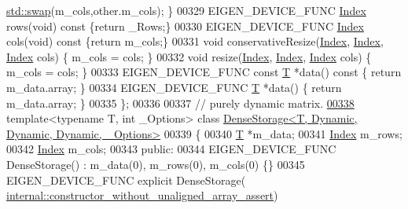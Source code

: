\begin{DoxyCode}
      \hyperlink{endian_8c_a3ca5ecd34b04d6a243c054ac3a57f68d}{std::swap}(m\_cols,other.m\_cols); \}
00329     EIGEN\_DEVICE\_FUNC \hyperlink{namespace_eigen_a62e77e0933482dafde8fe197d9a2cfde}{Index} rows(\textcolor{keywordtype}{void})\textcolor{keyword}{ const }\{\textcolor{keywordflow}{return} \_Rows;\}
00330     EIGEN\_DEVICE\_FUNC \hyperlink{namespace_eigen_a62e77e0933482dafde8fe197d9a2cfde}{Index} cols(\textcolor{keywordtype}{void})\textcolor{keyword}{ const }\{\textcolor{keywordflow}{return} m\_cols;\}
00331     \textcolor{keywordtype}{void} conservativeResize(\hyperlink{namespace_eigen_a62e77e0933482dafde8fe197d9a2cfde}{Index}, \hyperlink{namespace_eigen_a62e77e0933482dafde8fe197d9a2cfde}{Index}, \hyperlink{namespace_eigen_a62e77e0933482dafde8fe197d9a2cfde}{Index} cols) \{ m\_cols = cols; \}
00332     \textcolor{keywordtype}{void} resize(\hyperlink{namespace_eigen_a62e77e0933482dafde8fe197d9a2cfde}{Index}, \hyperlink{namespace_eigen_a62e77e0933482dafde8fe197d9a2cfde}{Index}, \hyperlink{namespace_eigen_a62e77e0933482dafde8fe197d9a2cfde}{Index} cols) \{ m\_cols = cols; \}
00333     EIGEN\_DEVICE\_FUNC \textcolor{keyword}{const} \hyperlink{group___sparse_core___module_class_eigen_1_1_triplet}{T} *data()\textcolor{keyword}{ const }\{ \textcolor{keywordflow}{return} m\_data.array; \}
00334     EIGEN\_DEVICE\_FUNC \hyperlink{group___sparse_core___module_class_eigen_1_1_triplet}{T} *data() \{ \textcolor{keywordflow}{return} m\_data.array; \}
00335 \};
00336 
00337 \textcolor{comment}{// purely dynamic matrix.}
\hyperlink{class_eigen_1_1_dense_storage_3_01_t_00_01_dynamic_00_01_dynamic_00_01_dynamic_00_01___options_01_4}{00338} \textcolor{keyword}{template}<\textcolor{keyword}{typename} T, \textcolor{keywordtype}{int} \_Options> \textcolor{keyword}{class }
      \hyperlink{class_eigen_1_1_dense_storage_3_01_t_00_01_dynamic_00_01_dynamic_00_01_dynamic_00_01___options_01_4}{DenseStorage<T, Dynamic, Dynamic, Dynamic, \_Options>}
00339 \{
00340     \hyperlink{group___sparse_core___module}{T} *m\_data;
00341     \hyperlink{namespace_eigen_a62e77e0933482dafde8fe197d9a2cfde}{Index} m\_rows;
00342     \hyperlink{namespace_eigen_a62e77e0933482dafde8fe197d9a2cfde}{Index} m\_cols;
00343   \textcolor{keyword}{public}:
00344     EIGEN\_DEVICE\_FUNC DenseStorage() : m\_data(0), m\_rows(0), m\_cols(0) \{\}
00345     EIGEN\_DEVICE\_FUNC \textcolor{keyword}{explicit} DenseStorage(
      \hyperlink{struct_eigen_1_1internal_1_1constructor__without__unaligned__array__assert}{internal::constructor\_without\_unaligned\_array\_assert})

\end{DoxyCode}
